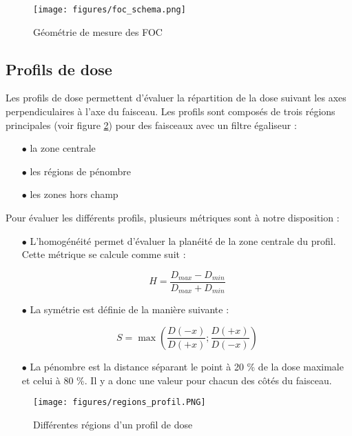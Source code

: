 \documentclass{article}
\begin{document}
\begin{figure}[h]
  \centering
  \texttt{[image: figures/foc\_schema.png]}
  \caption{Géométrie de mesure des FOC \cite{mayles2007handbook}}
  \label{fig_foc}
\end{figure}

\subsection{Profils de dose}

Les profils de dose permettent d'évaluer la répartition de la dose suivant les axes perpendiculaires à l'axe du faisceau. Les profils sont composés de trois régions principales (voir figure \ref*{fig_regions_profil}) pour des faisceaux avec un filtre égaliseur :

\begin{itemize}
  \item[$\bullet$] la zone centrale
  \item[$\bullet$] les régions de pénombre
  \item[$\bullet$] les zones hors champ
\end{itemize}

Pour évaluer les différents profils, plusieurs métriques sont à notre disposition :

\begin{itemize}
  \item[$\bullet$] L'homogénéité permet d'évaluer la planéité de la zone centrale du profil. Cette métrique se calcule comme suit :
  
  \begin{equation}
    H = \dfrac{D_{max} - D_{min}}{D_{max} + D_{min}}
    \label{eq_homogeneite}
  \end{equation}
  
  \item[$\bullet$] La symétrie est définie de la manière suivante :
  
  \begin{equation}
    S = \max\left(\dfrac{D(-x)}{D(+x)}; \dfrac{D(+x)}{D(-x)}\right)
    \label{eq_symetrie}
  \end{equation}
  
  \item[$\bullet$] La pénombre est la distance séparant le point à 20 \% de la dose maximale et celui à 80 \%. Il y a donc une valeur pour chacun des côtés du faisceau.  
\end{itemize}

\begin{figure}[h]
  \centering
  \texttt{[image: figures/regions\_profil.PNG]}
  \caption{Différentes régions d'un profil de dose}
  \label{fig_regions_profil}
\end{figure}
\end{document}
